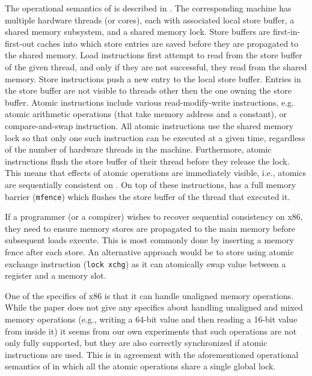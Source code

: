 The operational semantics of \xtso is described in .
The corresponding machine has multiple hardware threads (or cores), each with
associated local store buffer, a shared memory subsystem, and a shared memory
lock.
Store buffers are first-in-first-out caches into which store entries are saved
before they are propagated to the shared memory.
Load instructions first attempt to read from the store buffer of the given
thread, and only if they are not successful, they read from the shared memory.
Store instructions push a new entry to the local store buffer.
Entries in the store buffer are not visible to threads other then the one
owning the store buffer.
Atomic instructions include various read-modify-write instructions, e.g. atomic
arithmetic operations (that take memory address and a constant),
or compare-and-swap instruction.
All atomic instructions use the shared memory lock so that only one such
instruction can be executed at a given time, regardless of the number of
hardware threads in the machine.
Furthermore, atomic instructions flush the store buffer of their thread before
they release the lock.
This means that effects of atomic operations are immediately visible, i.e.,
atomics are sequentially consistent on \xtso.
On top of these instructions, \xtso has a full memory barrier (\texttt{mfence})
which flushes the store buffer of the thread that executed it.

If a programmer (or a compirer) wishes to recover sequential consistency on
x86, they need to ensure memory stores are propagated to the main memory before
subsequent loads execute.
This is most commonly done by inserting a memory fence after each store.
An alternative approach would be to store using atomic exchange instruction
(\texttt{lock xchg}) as it can atomically swap value between a register and a
memory slot.

One of the specifics of x86 is that it can handle unaligned memory
operations.
While the \xtso paper does not give any specifics about handling unaligned and
mixed memory operations (e.g., writing a 64-bit value and then reading a 16-bit
value from inside it) it seems from our own experiments that such operations
are not only fully supported, but they are also correctly synchronized if
atomic instructions are used.
This is in agreement with the aforementioned operational semantics of \xtso in
which all the atomic operations share a single global lock.

